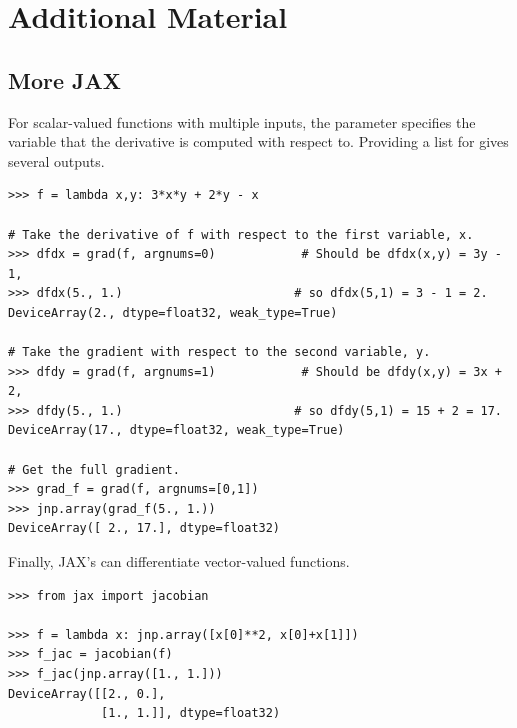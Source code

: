 \newpage

\section*{Additional Material} %

\subsection*{More JAX} %

For scalar-valued functions with multiple inputs, the parameter  specifies the variable that the derivative is computed with respect to.
Providing a list for  gives several outputs.

\begin{lstlisting}
>>> f = lambda x,y: 3*x*y + 2*y - x

# Take the derivative of f with respect to the first variable, x.
>>> dfdx = grad(f, argnums=0)            # Should be dfdx(x,y) = 3y - 1,
>>> dfdx(5., 1.)                        # so dfdx(5,1) = 3 - 1 = 2.
DeviceArray(2., dtype=float32, weak_type=True)

# Take the gradient with respect to the second variable, y.
>>> dfdy = grad(f, argnums=1)            # Should be dfdy(x,y) = 3x + 2,
>>> dfdy(5., 1.)                        # so dfdy(5,1) = 15 + 2 = 17.
DeviceArray(17., dtype=float32, weak_type=True)

# Get the full gradient.
>>> grad_f = grad(f, argnums=[0,1])
>>> jnp.array(grad_f(5., 1.))
DeviceArray([ 2., 17.], dtype=float32)
\end{lstlisting}

Finally, JAX's  can differentiate vector-valued functions.

\begin{lstlisting}
>>> from jax import jacobian

>>> f = lambda x: jnp.array([x[0]**2, x[0]+x[1]])
>>> f_jac = jacobian(f)
>>> f_jac(jnp.array([1., 1.]))
DeviceArray([[2., 0.],
             [1., 1.]], dtype=float32)
\end{lstlisting}


